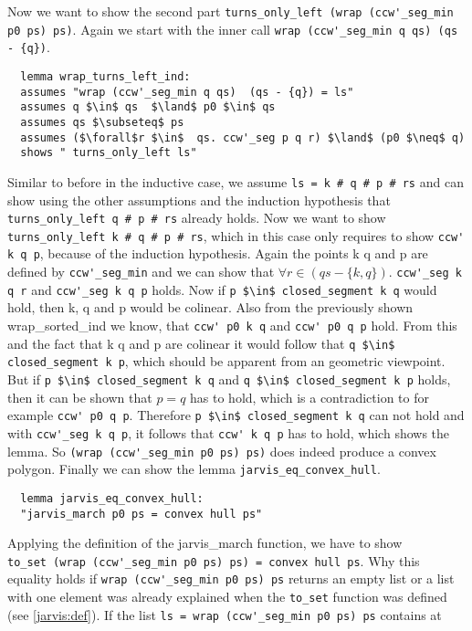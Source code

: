 Now we want to show the second part \lstinline|turns_only_left (wrap (ccw'_seg_min p0 ps) ps)|.
Again we start with the inner call \lstinline|wrap (ccw'_seg_min q qs) (qs - {q})|.
\begin{lstlisting}
  lemma wrap_turns_left_ind:
  assumes "wrap (ccw'_seg_min q qs)  (qs - {q}) = ls"
  assumes q $\in$ qs  $\land$ p0 $\in$ qs
  assumes qs $\subseteq$ ps
  assumes ($\forall$r $\in$  qs. ccw'_seg p q r) $\land$ (p0 $\neq$ q)
  shows " turns_only_left ls"
\end{lstlisting}
Similar to before in the inductive case, we assume \lstinline|ls = k # q # p # rs|
and can show using the other assumptions and the induction hypothesis that
\lstinline|turns_only_left q # p # rs| already holds. Now we want to show  
\lstinline|turns_only_left k # q # p # rs|, which in this case only requires to
show \lstinline|ccw' k q p|, because of the induction hypothesis. Again the points 
k q and p are defined by \lstinline|ccw'_seg_min| and we can show that    
$\forall r \in  (qs - \{k,q\}).$ \lstinline|ccw'_seg k q r| and \lstinline|ccw'_seg k q p| 
holds. Now if \lstinline|p $\in$ closed_segment k q| would hold, then k, q and p would be
colinear. Also from the previously shown wrap\_sorted\_ind we know, that 
\lstinline|ccw' p0 k q| and \lstinline|ccw' p0 q p| hold. From this and the fact
that k q and p are colinear it would follow that \lstinline|q $\in$ closed_segment k p|,
which should be apparent from an geometric viewpoint. But if 
\lstinline|p $\in$ closed_segment k q| and \lstinline|q $\in$ closed_segment k p| holds,
then it can be shown that $p = q$ has to hold, which is a contradiction to for example 
\lstinline|ccw' p0 q p|. Therefore \lstinline|p $\in$ closed_segment k q| can not hold
and with \lstinline|ccw'_seg k q p|, it follows that \lstinline|ccw' k q p| has to hold,
which shows the lemma.
So \lstinline|(wrap (ccw'_seg_min p0 ps) ps)| does indeed produce a convex polygon. 
Finally we can show the lemma \lstinline|jarvis_eq_convex_hull|.
\begin{lstlisting}
  lemma jarvis_eq_convex_hull:
  "jarvis_march p0 ps = convex hull ps"  
\end{lstlisting}
Applying the definition of the jarvis\_march function, we have to show \\
\lstinline|to_set (wrap (ccw'_seg_min p0 ps) ps) = convex hull ps|.
Why this equality holds if \lstinline|wrap (ccw'_seg_min p0 ps) ps| returns an empty list 
or a list with one element was already explained when the \lstinline|to_set| function
was defined (see \ref*{jarvis:def}). If the list \lstinline|ls = wrap (ccw'_seg_min p0 ps) ps| contains at 
